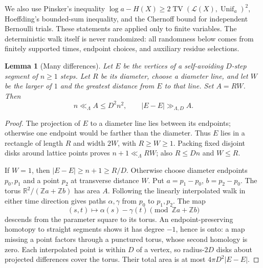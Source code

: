 \documentclass[11pt]{article}
\numberwithin{equation}{section}
\newtheorem{lemma}[theorem]{Lemma}
\theoremstyle{definition}\newtheorem{definition}[theorem]{Definition}
\theoremstyle{remark}\newtheorem{remark}[theorem]{Remark}
\newcommand{\Z}{\mathbb Z}\newcommand{\Q}{\mathbb Q}\newcommand{\R}{\mathbb R}
\newcommand{\abs}[1]{\lvert #1\rvert}
\newcommand{\TV}{\operatorname{TV}}
\begin{document}
We also use Pinsker's inequality
$\log a-H(X)\ge2\TV(\mathcal L(X),\operatorname{Unif}_a)^2$,
Hoeffding's bounded-sum inequality, and the Chernoff bound for independent Bernoulli trials. These statements are applied only to finite variables. The deterministic walk itself is never randomized: all randomness below comes from finitely supported times, endpoint choices, and auxiliary residue selections.

\begin{lemma}[Many differences]\label{lem:differences}
Let $E$ be the vertices of a self-avoiding $D$-step segment of $n\ge1$ steps. Let $R$ be its diameter, choose a diameter line, and let $W$ be the larger of $1$ and the greatest distance from $E$ to that line. Set $A=RW$. Then
\[
 n\ll_\Lambda A\le D^2n^2,
 \qquad \abs{E-E}\gg_{\Lambda,D} A.
\]
\end{lemma}
\begin{proof}
The projection of $E$ to a diameter line lies between its endpoints; otherwise one endpoint would be farther than the diameter. Thus $E$ lies in a rectangle of length $R$ and width $2W$, with $R\ge W\ge1$. Packing fixed disjoint disks around lattice points proves $n+1\ll_\Lambda RW$; also $R\le Dn$ and $W\le R$.

If $W=1$, then $\abs{E-E}\ge n+1\ge R/D$. Otherwise choose diameter endpoints $p_0,p_1$ and a point $p_2$ at transverse distance $W$. Put $a=p_1-p_0$, $b=p_2-p_0$. The torus $\R^2/(\Z a+\Z b)$ has area $A$. Following the linearly interpolated walk in either time direction gives paths $\alpha,\gamma$ from $p_0$ to $p_1,p_2$. The map
\[
 (s,t)\longmapsto \alpha(s)-\gamma(t)\pmod{\Z a+\Z b}
\]
descends from the parameter square to its torus. An endpoint-preserving homotopy to straight segments shows it has degree $-1$, hence is onto: a map missing a point factors through a punctured torus, whose second homology is zero. Each interpolated point is within $D$ of a vertex, so radius-$2D$ disks about projected differences cover the torus. Their total area is at most $4\pi D^2\abs{E-E}$.
\end{proof}
\end{document}
